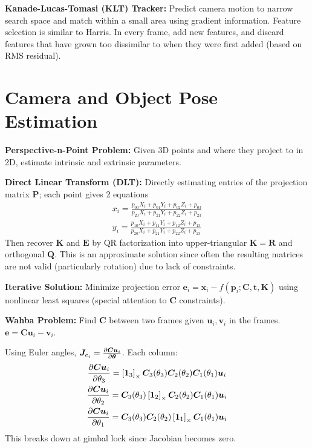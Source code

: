 \documentclass[twocolumn, 10pt]{extarticle}
\begin{document}
\textbf{Kanade-Lucas-Tomasi (KLT) Tracker:} Predict camera motion to narrow search space and match within a small area using
gradient information. Feature selection is similar to Harris. In every frame, add new features, and discard features
that have grown too dissimilar to when they were first added (based on RMS residual).

\section{Camera and Object Pose Estimation} %

\textbf{Perspective-n-Point Problem:} Given 3D points and where they project to in 2D, estimate intrinsic and extrinsic
parameters.

\textbf{Direct Linear Transform (DLT):} Directly estimating entries of the projection matrix \(\bm P\); each point gives
2 equations
\begin{gather*}
x_i = \frac{p_{00}X_i + p_{01}Y_i + p_{02}Z_i + p_{03}}{p_{20}X_i + p_{21}Y_i + p_{22}Z_i + p_{23}} 
\\
y_i = \frac{p_{10}X_i + p_{11}Y_i + p_{12}Z_i + p_{13}}{p_{20}X_i + p_{21}Y_i + p_{22}Z_i + p_{23}}
\end{gather*}
Then recover \(\bm K\) and \(\bm E\) by QR factorization into upper-triangular \(\bm K = \bm R\) and orthogonal \(\bm
Q\). This is an approximate solution since often the resulting matrices are not valid (particularly rotation) due to
lack of constraints.

\textbf{Iterative Solution:} Minimize projection error \(\bm e_i = \bm x_i - f(\bm p_i; \bm C, \bm t, \bm K)\) using
nonlinear least squares (special attention to \(\bm C\) constraints).

\textbf{Wahba Problem:} Find $\bm C$ between two frames given $\bm u_i, \bm v_i$ in the frames.
\(\bm e = \bm C\bm u_i - \bm v_i\).

Using Euler angles, \(\bm J_{e_i} = \frac{\partial\bm C\bm u_i}{\partial\bm\theta}\). Each column:
\begin{gather*}
    \frac{\partial\bm C\bm u_i}{\partial\theta _3} = \left[\bm 1_3\right]_{\times}\bm C_3(\theta _3)\bm C_2(\theta _2)\bm C_1(\theta _1)\bm u_i \\
    \frac{\partial\bm C\bm u_i}{\partial\theta _2} = \bm C_3(\theta _3)\left[\bm 1_2\right]_{\times}\bm C_2(\theta _2)\bm C_1(\theta _1)\bm u_i \\
    \frac{\partial\bm C\bm u_i}{\partial\theta _1} = \bm C_3(\theta _3)\bm C_2(\theta _2)\left[\bm 1_1\right]_{\times}\bm C_1(\theta _1)\bm u_i
\end{gather*}
This breaks down at gimbal lock since Jacobian becomes zero.
\end{document}
